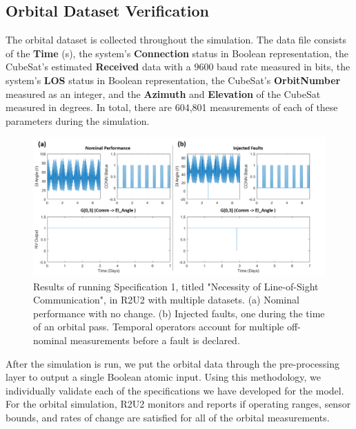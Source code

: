 \documentclass[conf]{new-aiaa}
\begin{document}
\subsection{Orbital Dataset Verification}

The orbital dataset is collected throughout the simulation. The data file consists of the \textbf{Time} (s), the system's \textbf{Connection} status in Boolean representation, the CubeSat's estimated \textbf{Received} data with a 9600 baud rate measured in bits, the system's \textbf{LOS} status in Boolean representation,	the CubeSat's \textbf{OrbitNumber} measured as an integer, and the \textbf{Azimuth} and \textbf{Elevation} of the CubeSat measured in degrees. In total, there are 604,801 measurements of each of these parameters during the simulation.

\begin{figure}[!ht]
\centering
\includegraphics[width=.8\textwidth]{Fig/LOSEL_Spec1.png}
\caption{Results of running Specification 1, titled "Necessity of Line-of-Sight Communication", in R2U2 with multiple datasets. (a) Nominal performance with no change. (b) Injected faults, one during the time of an orbital pass. Temporal operators account for multiple off-nominal measurements before a fault is declared.}
\label{ConnElSpecResults}
\end{figure}

After the simulation is run, we put the orbital data through the pre-processing layer to output a single Boolean atomic input. Using this methodology, we individually validate each of the specifications we have developed for the model. For the orbital simulation, R2U2 monitors and reports if operating ranges, sensor bounds, and rates of change are satisfied for all of the orbital measurements.
\end{document}
